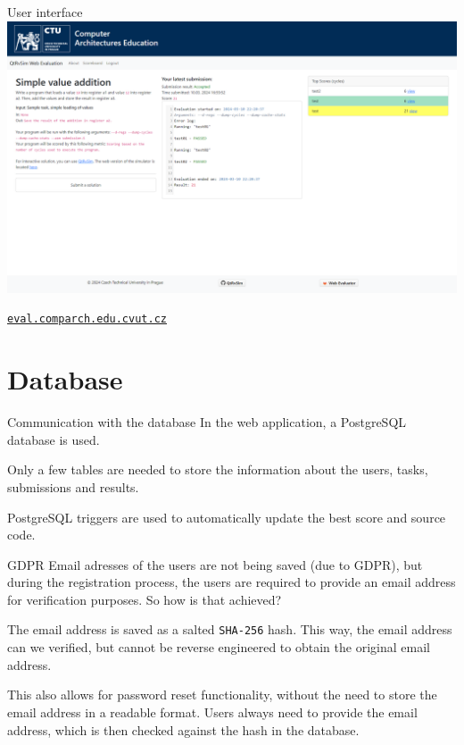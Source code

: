 \documentclass{beamer}
\begin{document}
	\begin{frame}{User interface}
		\centering
		\includegraphics[width=1.0\textwidth]{images/ui.png}

		\href{http://eval.comparch.edu.cvut.cz}{\texttt{eval.comparch.edu.cvut.cz}}
	\end{frame}

	\section{Database}

	\begin{frame}{Communication with the database}
		In the web application, a PostgreSQL database is used. \par

		Only a few tables are needed to store the information about the users, tasks, submissions and results. \par

		PostgreSQL triggers are used to automatically update the best score and source code. 
	\end{frame}

	\begin{frame}{GDPR}
		Email adresses of the users are not being saved (due to GDPR), but during the registration process, the users are required to provide an email address for verification purposes. So how is that achieved?\par

		The email address is saved as a salted \texttt{SHA-256} hash. This way, the email address can we verified, but cannot be reverse engineered to obtain the original email address. \par

		This also allows for password reset functionality, without the need to store the email address in a readable format. Users always need to provide the email address, which is then checked against the hash in the database.
	\end{frame}
\end{document}
